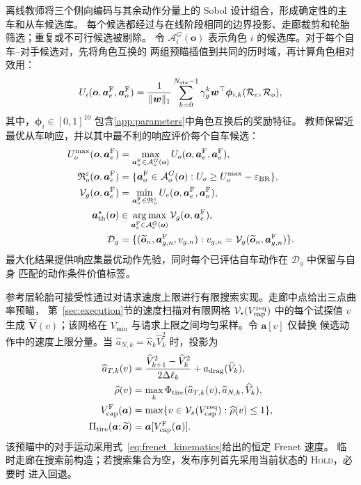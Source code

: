 \documentclass[final,5p,twocolumn]{elsarticle}
\DeclareMathOperator*{\argmax}{arg\,max}
\begin{document}
离线教师将三个侧向编码与其余动作分量上的 Sobol 设计组合，形成确定性的主车和从车候选库。
每个候选都经过与在线阶段相同的边界投影、走廊裁剪和轮胎筛选；重复或不可行候选被剔除。
令 $\mathcal A_i^G(\bm o)$ 表示角色 $i$ 的候选库。对于每个自车--对手候选对，先将角色互换的
两组预瞄插值到共同的历时域，再计算角色相对效用：
\begin{equation}
U_i(\bm o,\bm a_e^{\rm F},\bm a_o^{\rm F})=
\frac{1}{\|\bm w\|_1}\sum_{k=0}^{N_{\rm sta}-1}
\gamma_g^k\bm w^\top
\bm\phi_{i,k}(\mathcal R_e,\mathcal R_o),
\label{eq:game_utility}
\end{equation}
其中，$\bm\phi_i\in[0,1]^{10}$ 包含\ref{app:parameters}中角色互换后的奖励特征。
教师保留近最优从车响应，并以其中最不利的响应评价每个自车候选：
\begin{equation}
\begin{aligned}
U_o^{\max}(\bm o,\bm a_e^{\rm F})
&=\max_{\bm a_o^{\rm F}\in\mathcal A_o^G(\bm o)}
U_o(\bm o,\bm a_e^{\rm F},\bm a_o^{\rm F}),\\
\mathfrak R_o^\varepsilon(\bm o,\bm a_e^{\rm F})
&=\{\bm a_o^{\rm F}\in\mathcal A_o^G(\bm o):
U_o\ge U_o^{\max}-\varepsilon_{\rm BR}\},\\
\mathcal V_g(\bm o,\bm a_e^{\rm F})
&=\min_{\bm a_o^{\rm F}\in\mathfrak R_o^\varepsilon}
U_e(\bm o,\bm a_e^{\rm F},\bm a_o^{\rm F}),\\
\bm a_{\rm th}^{\star}(\bm o)
&\in\argmax_{\bm a_e^{\rm F}\in\mathcal A_e^G(\bm o)}
\mathcal V_g(\bm o,\bm a_e^{\rm F}),\\
\mathcal D_g&=\{(\widetilde{\bm o}_n,\bm a_{g,n}^{\rm F},v_{g,n}):
v_{g,n}=\mathcal V_g(\widetilde{\bm o}_n,\bm a_{g,n}^{\rm F})\}.
\end{aligned}
\label{eq:response_set_teacher}
\end{equation}
最大化结果提供响应集最优动作先验，同时每个已评估自车动作在 $\mathcal D_g$ 中保留与自身
匹配的动作条件价值标签。

参考层轮胎可接受性通过对请求速度上限进行有限搜索实现。走廊中点给出三点曲率预瞄，
第~\ref{sec:execution}节的速度扫描对有限网格
$\mathcal V_s(V_{\rm cap}^{\rm req})$ 中的每个试探值 $v$ 生成
$\widehat{\bm V}(v)$；该网格在 $V_{\min}$ 与请求上限之间均匀采样。令 $\bm a[v]$ 仅替换
候选动作中的速度上限分量。当 $\widehat a_{N,k}=\widehat\kappa_k\widehat V_k^2$ 时，投影为
\begin{equation}
\begin{aligned}
\widehat a_{T,k}(v)&=
\frac{\widehat V_{k+1}^2-\widehat V_k^2}{2\Delta\ell_k}
+a_{\rm drag}(\widehat V_k),\\
\widehat\rho(v)&=\max_k\Phi_{\rm tire}(\widehat a_{T,k}(v),
\widehat a_{N,k},\widehat V_k),\\
V_{\rm cap}^{\rm F}(\bm a)&=\max\{v\in\mathcal V_s(V_{\rm cap}^{\rm req}):
\widehat\rho(v)\le1\},\\
\Pi_{\rm tire}(\bm a;\widetilde{\bm o})
&=\bm a[V_{\rm cap}^{\rm F}(\bm a)].
\end{aligned}
\label{eq:tire_safe_action}
\end{equation}
该预瞄中的对手运动采用式~\eqref{eq:frenet_kinematics}给出的恒定 Frenet 速度。
临时走廊在搜索前构造；若搜索集合为空，发布序列首先采用当前状态的 \textsc{Hold}，必要时
进入回退。
\end{document}
